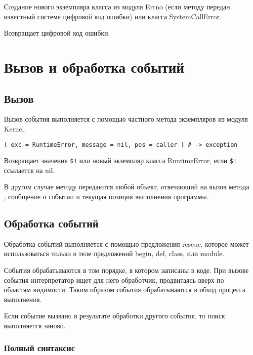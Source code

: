 \begin{methodlist}
  Создание нового экземпляра класса из модуля Errno (если методу передан известный системе цифровой код ошибки) или класса SystemCallError. 

  Возвращает цифровой код ошибки. 
\end{methodlist}

\section{Вызов и обработка событий}

\subsection{Вызов}

Вызов события выполняется с помощью частного метода экземпляров из модуля Kernel.

\begin{methodlist}
  \verb!( exc = RuntimeError, message = nil, pos = caller ) # -> exception!

  Возвращает значение \verb/$!/ или новый экземпляр класса RuntimeError, если \verb/$!/ ссылается на nil.

  В другом случае методу передаются любой объект, отвечающий на вызов метода , сообщение о событии и текущая позиция выполнения программы.
\end{methodlist}

\subsection{Обработка событий}

Обработка событий выполняется с помощью предложения rescue, которое может использоваться только в теле предложений begin, def, class, или module.

События обрабатываются в том порядке, в котором записаны в коде. При вызове события интерпретатор ищет для него обработчик, продвигаясь вверх по областям видимости. Таким образом события обрабатываются в обход процесса выполнения.

Если событие вызвано в результате обработки другого события, то поиск выполняется заново. 

\subsubsection*{Полный синтаксис}

